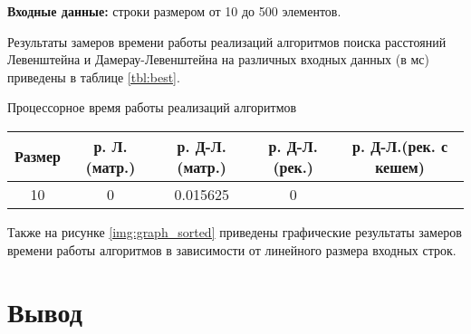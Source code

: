 \textbf{Входные данные:} строки размером от 10 до 500 элементов.

Результаты замеров времени работы реализаций алгоритмов поиска расстояний Левенштейна и Дамерау-Левенштейна на различных входных данных (в мс) приведены в таблице \ref{tbl:best}.


\begin{center}
	\begin{threeparttable}
		\caption{Процессорное время работы реализаций алгоритмов}
		\label{tbl:best}
		\begin{tabular}{|c|c|c|c|c|}
			\hline
			Размер &р. Л.(матр.) &р. Д-Л.(матр.)  &р. Д-Л.(рек.)&р. Д-Л.(рек. с кешем)\\
			\hline
			10 & 0  &  0.015625 &0 & \\ 
			\hline
		
		\end{tabular}
		
	\end{threeparttable}
\end{center}
Также на рисунке \ref{img:graph_sorted} приведены графические результаты замеров времени работы алгоритмов в зависимости от линейного размера входных строк.

\begin{center}
	\label{img:graph_sorted}
\end{center}
\newpage

\section{Вывод}
